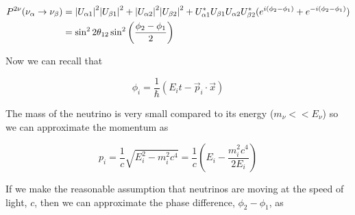 \begin{equation}
\begin{split}
P^{2\nu}(\nu_\alpha \rightarrow \nu_\beta) 
&=  \abs{U_{\alpha 1}}^{2}\abs{U_{\beta 1}}^2 + \abs{U_{\alpha 2}}^2\abs{U_{\beta 2}}^2 +
U^{*}_{\alpha 1}U_{\beta 1}U_{\alpha 2}U^{*}_{\beta 2}(e^{i(\phi_2-\phi_1)} + e^{-i(\phi_2 - \phi_1)}) \\ 
&= \sin^22\theta_{12}\sin^2\left(\frac{\phi_2-\phi_1}{2}\right)
\end{split}
\end{equation}

Now we can recall that 

\begin{equation}
	\phi_i = \frac{1}{\hbar}(E_{i}t - \vec{p}_{i}\cdot\vec{x})
\end{equation}

The mass of the neutrino is very small compared to its energy ($m_\nu << E_\nu$) so we can approximate the momentum as

\begin{equation}
	p_i = \frac{1}{c}\sqrt{E^2_i-m^2_ic^4 } = \frac{1}{c}\left(E_i - \frac{m^2_ic^4}{2E_i} \right)
\end{equation}

If we make the reasonable assumption that neutrinos are moving at the speed of light, $c$, then we can approximate the phase difference, $\phi_2 - \phi_1$, as 


